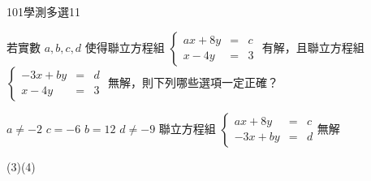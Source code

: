     \begin{QUESTION}
        \begin{ExamInfo}{101}{學測}{多選}{11}
        \end{ExamInfo}
        \begin{ExamAnsRateInfo}{37}{62}{29}{20}
        \end{ExamAnsRateInfo}
        \begin{QBODY}
            若實數 $a, b, c,  d$ 使得聯立方程組
			$\left\{\begin{array}{ccc} ax+8y & = & c \\ x-4y & = & 3 \end{array}\right.$
			有解，且聯立方程組 $\left\{\begin{array}{ccc} -3x+by & = & d \\ x-4y & = & 3 \end{array}\right.$
			無解，則下列哪些選項一定正確？ 
			\begin{QOPS} 
				\QOP  $a \neq -2$
				\QOP  $c = -6$    
				\QOP  $b =12$    
				\QOP  $d \neq -9$ 
				\QOP  聯立方程組 $\left\{\begin{array}{ccc} ax+8y & = & c \\ -3x+by & = & d \end{array}\right.$無解
			\end{QOPS}
        \end{QBODY}
        \begin{QFROMS}
        \end{QFROMS}
        \begin{QTAGS}\end{QTAGS}
        \begin{QANS}
            (3)(4)
        \end{QANS}
        \begin{QSOLLIST}
        \end{QSOLLIST}
        \begin{QEMPTYSPACE}
        \end{QEMPTYSPACE}
    \end{QUESTION}
